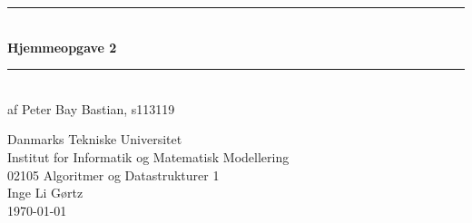 \begin{titlepage}
	\centering \parindent=0pt
	\newcommand{\HRule}{\rule{\textwidth}{1mm}}
	 \HRule\\[1cm]\Huge\bfseries
	Hjemmeopgave 2\\[0.7cm]
	\HRule\\[4cm]  \large af Peter Bay Bastian, s113119\\
	 \normalsize %
	\begin{flushleft}
	Danmarks Tekniske Universitet\\
	Institut for Informatik og Matematisk Modellering\\
	02105 Algoritmer og Datastrukturer 1\\
	Inge Li Gørtz\\
	\today \end{flushleft}
\end{titlepage}